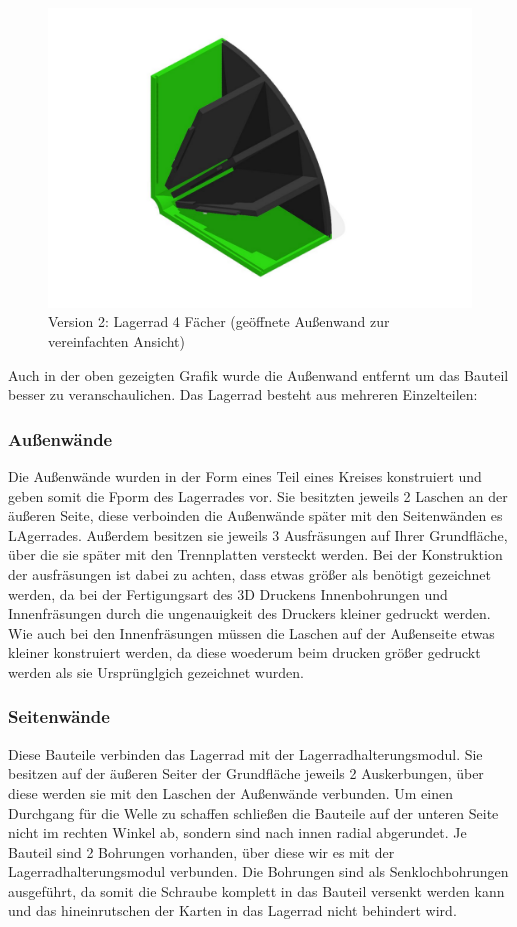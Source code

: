 \begin{figure}[H]
    \centering
    \includegraphics[scale=0.5,page=1]{fig/mech/LagerRad4F}
    \caption{Version 2: Lagerrad 4 Fächer (geöffnete Außenwand zur vereinfachten Ansicht)}
\end{figure}


Auch in der oben gezeigten Grafik wurde die Außenwand entfernt um das Bauteil besser zu veranschaulichen.
Das Lagerrad besteht aus mehreren Einzelteilen:

\subsubsection{Außenwände}
Die Außenwände wurden in der Form eines Teil eines Kreises konstruiert und geben somit die Fporm des Lagerrades vor. Sie besitzten jeweils 2 Laschen an der äußeren Seite, diese verboinden die Außenwände später mit den Seitenwänden es LAgerrades.
Außerdem besitzen sie jeweils 3 Ausfräsungen auf Ihrer Grundfläche, über die sie später mit den Trennplatten versteckt werden. Bei der Konstruktion der ausfräsungen ist dabei zu achten, dass etwas größer als benötigt gezeichnet werden, da bei der
Fertigungsart des 3D Druckens Innenbohrungen und Innenfräsungen durch die ungenauigkeit des Druckers kleiner gedruckt werden. Wie auch bei den Innenfräsungen müssen die Laschen auf der Außenseite etwas kleiner konstruiert werden, da diese woederum beim
drucken größer gedruckt werden als sie Ursprünglgich gezeichnet wurden.

\subsubsection{Seitenwände}
Diese Bauteile verbinden das Lagerrad mit der Lagerradhalterungsmodul. Sie besitzen auf der äußeren Seiter der Grundfläche
jeweils 2 Auskerbungen, über diese werden sie mit den Laschen der Außenwände verbunden. Um einen Durchgang für die Welle zu schaffen
schließen die Bauteile auf der unteren Seite nicht im rechten Winkel ab, sondern sind nach innen radial abgerundet.
Je Bauteil sind 2 Bohrungen vorhanden, über diese wir es mit der Lagerradhalterungsmodul verbunden.
Die Bohrungen sind als Senklochbohrungen ausgeführt, da somit die Schraube komplett in das Bauteil versenkt werden kann
 und das hineinrutschen der Karten in das Lagerrad nicht behindert wird.

